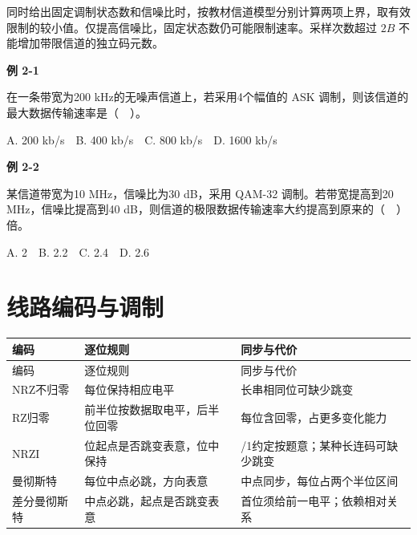 同时给出固定调制状态数和信噪比时，按教材信道模型分别计算两项上界，取有效限制的较小值。仅提高信噪比，固定状态数仍可能限制速率。采样次数超过 \(2B\) 不能增加带限信道的独立码元数。

\par\medskip{}\noindent\hypertarget{CN02-E01}{}\label{CN02-E01}\textbf{例 2-1}\par\nobreak\smallskip

在一条带宽为200 kHz的无噪声信道上，若采用4个幅值的 ASK 调制，则该信道的最大数据传输速率是（　）。

A. 200 kb/s　B. 400 kb/s　C. 800 kb/s　D. 1600 kb/s

\par\medskip{}\noindent\hypertarget{CN02-E02}{}\label{CN02-E02}\textbf{例 2-2}\par\nobreak\smallskip

某信道带宽为10 MHz，信噪比为30 dB，采用 QAM-32 调制。若带宽提高到20 MHz，信噪比提高到40 dB，则信道的极限数据传输速率大约提高到原来的（　）倍。

A. 2　B. 2.2　C. 2.4　D. 2.6

\section{线路编码与调制}\label{CN02-coding}

\par\smallskip
\begin{wideblock}
{\fontsize{9.3}{12}\selectfont\setlength{\tabcolsep}{2.5pt}\setlength{\LTleft}{0pt}\setlength{\LTright}{0pt}
\begin{longtable}{@{}>{\raggedright\arraybackslash}p{}>{\raggedright\arraybackslash}p{}>{\raggedright\arraybackslash}p{}@{}}
\toprule
编码 & 逐位规则 & 同步与代价 \\

\midrule\endfirsthead\toprule
编码 & 逐位规则 & 同步与代价 \\

\midrule\endhead\bottomrule\endfoot
NRZ不归零 & 每位保持相应电平 & 长串相同位可缺少跳变 \\

RZ归零 & 前半位按数据取电平，后半位回零 & 每位含回零，占更多变化能力 \\

NRZI & 位起点是否跳变表意，位中保持 & 0/1约定按题意；某种长连码可缺少跳变 \\

曼彻斯特 & 每位中点必跳，方向表意 & 中点同步，每位占两个半位区间 \\

差分曼彻斯特 & 中点必跳，起点是否跳变表意 & 首位须给前一电平；依赖相对关系 \\

\end{longtable}}
\end{wideblock}
\par\smallskip

